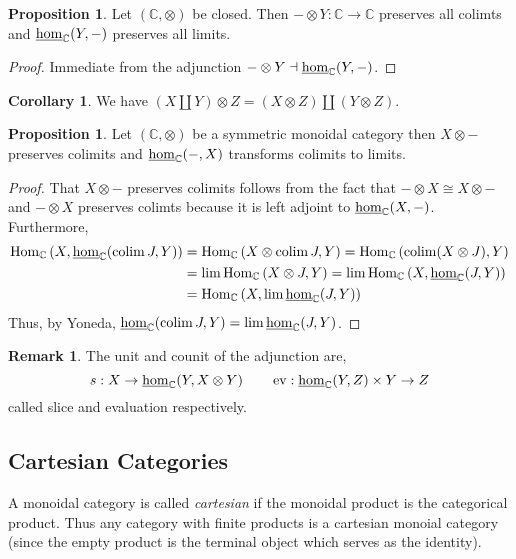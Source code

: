 \documentclass[12pt]{extarticle}
\newcommand{\Hom}[3]{\mathrm{Hom}_{#1}\left( #2, #3 \right)}
\DeclareMathOperator{\colim}{\mathrm{colim}}
\theoremstyle{definition}
\newtheorem{proposition}[theorem]{Proposition}
\newtheorem{corollary}[theorem]{Corollary}
\newtheorem{remark}{Remark}
\newenvironment{definition}[1][Definition:]{\begin{trivlist}
\item[\hskip \labelsep {\bfseries #1}]}{\end{trivlist}}
\newcommand{\C}{\mathbb{C}}
\begin{document}
\begin{proposition}
Let $(\C, \otimes)$ be closed. Then $- \otimes Y  : \C \to \C$ preserves all colimts and $\inthom{\C}{Y}{-}$ preserves all limits.
\end{proposition}

\begin{proof}
Immediate from the adjunction $- \otimes Y \dashv \inthom{\C}{Y}{-}$.
\end{proof}

\begin{corollary}
We have $(X \coprod Y) \otimes Z = (X \otimes Z) \coprod (Y \otimes Z)$.
\end{corollary}

\begin{proposition}
Let $(\C, \otimes)$ be a symmetric monoidal category then $X \otimes -$ preserves colimits and $\inthom{\C}{-}{X}$ transforms colimits to limits.
\end{proposition}

\begin{proof}
That $X \otimes -$ preserves colimits follows from the fact that $- \otimes X \cong X \otimes -$ and $- \otimes X$ preserves colimts because it is left adjoint to $\inthom{\C}{X}{-}$. Furthermore,
\begin{align*}
\Hom{\C}{X}{\inthom{\C}{\colim{J}}{Y}} & = \Hom{\C}{X \otimes \colim{J}}{Y} = \Hom{\C}{\colim(X \otimes J)}{Y}
\\
& = \lim \Hom{\C}{X \otimes J}{Y} = \lim \Hom{\C}{X}{\inthom{\C}{J}{Y}}
\\
& = \Hom{\C}{X}{\lim \inthom{\C}{J}{Y}}
\end{align*}
Thus, by Yoneda, $\inthom{\C}{\colim J}{Y} = \lim \inthom{\C}{J}{Y}$.
\end{proof}

\begin{remark}
The unit and counit of the adjunction are,
\[ s : X \to \inthom{\C}{Y}{X \otimes Y} \quad \quad \ev : \inthom{\C}{Y}{Z} \times Y \to Z \] called slice and evaluation respectively.
\end{remark}

\subsection{Cartesian Categories}

\begin{definition}
A monoidal category is called \textit{cartesian} if the monoidal product is the categorical product. Thus any category with finite products is a cartesian monoial category (since the empty product is the terminal object which serves as the identity). 
\end{definition}
\end{document}
